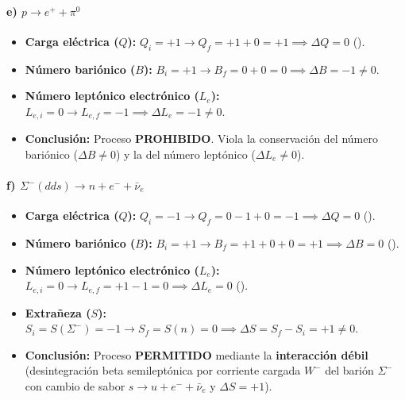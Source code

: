 \begin{problema}
\paragraph{e) $p \longrightarrow e^+ + \pi^0$}
\begin{itemize}
    \item \textbf{Carga eléctrica ($Q$):} $Q_i = +1 \to Q_f = +1 + 0 = +1 \implies \Delta Q = 0$ (\checkmark).
    \item \textbf{Número bariónico ($B$):} $B_i = +1 \to B_f = 0 + 0 = 0 \implies \Delta B = -1 \neq 0$.
    \item \textbf{Número leptónico electrónico ($L_e$):} $L_{e,i} = 0 \to L_{e,f} = -1 \implies \Delta L_e = -1 \neq 0$.
    \item \textbf{Conclusión:} Proceso \textbf{PROHIBIDO}. Viola la conservación del número bariónico ($\Delta B \neq 0$) y la del número leptónico ($\Delta L_e \neq 0$).
\end{itemize}

\paragraph{f) $\Sigma^- (dds) \longrightarrow n + e^- + \bar{\nu}_e$}
\begin{itemize}
    \item \textbf{Carga eléctrica ($Q$):} $Q_i = -1 \to Q_f = 0 - 1 + 0 = -1 \implies \Delta Q = 0$ (\checkmark).
    \item \textbf{Número bariónico ($B$):} $B_i = +1 \to B_f = +1 + 0 + 0 = +1 \implies \Delta B = 0$ (\checkmark).
    \item \textbf{Número leptónico electrónico ($L_e$):} $L_{e,i} = 0 \to L_{e,f} = +1 - 1 = 0 \implies \Delta L_e = 0$ (\checkmark).
    \item \textbf{Extrañeza ($S$):} $S_i = S(\Sigma^-) = -1 \to S_f = S(n) = 0 \implies \Delta S = S_f - S_i = +1 \neq 0$.
    \item \textbf{Conclusión:} Proceso \textbf{PERMITIDO} mediante la \textbf{interacción débil} (desintegración beta semileptónica por corriente cargada $W^-$ del barión $\Sigma^-$ con cambio de sabor $s \to u + e^- + \bar{\nu}_e$ y $\Delta S = +1$).
\end{itemize}
\end{problema}



